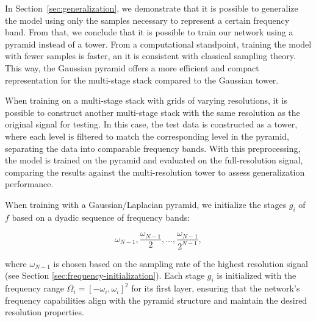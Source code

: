 In Section~\ref{sec:generalization}, we demonstrate that it is possible to generalize the model using only the samples necessary to represent a certain frequency band. From that, we conclude that it is possible to train our network using a pyramid instead of a tower. From a computational standpoint, training the model with fewer samples is faster, an it is consistent with classical sampling theory. This way, the Gaussian pyramid offers a more efficient and compact representation for the multi-stage stack compared to the Gaussian tower.

When training on a multi-stage stack with grids of varying resolutions, it is possible to construct another multi-stage stack with the same resolution as the original signal for testing. In this case, the test data is constructed as a tower, where each level is filtered to match the corresponding level in the pyramid, separating the data into comparable frequency bands. With this preprocessing, the model is trained on the pyramid and evaluated on the full-resolution signal, comparing the results against the multi-resolution tower to assess generalization performance.

When training with a Gaussian/Laplacian pyramid, we initialize the stages $g_i$ of $f$ based on a dyadic sequence of frequency bands:

\[
\omega_{N-1}, \frac{\omega_{N-1}}{2}, \ldots, \frac{\omega_{N-1}}{2^{N-1}},
\]

where \( \omega_{N-1} \) is chosen based on the sampling rate of the highest resolution signal (see Section \ref{sec:frequency-initialization}). Each stage \( g_i \) is initialized with the frequency range \( \Omega_i = \left[-\omega_i, \omega_i\right]^2 \) for its first layer, ensuring that the network's frequency capabilities align with the pyramid structure and maintain the desired resolution properties.


